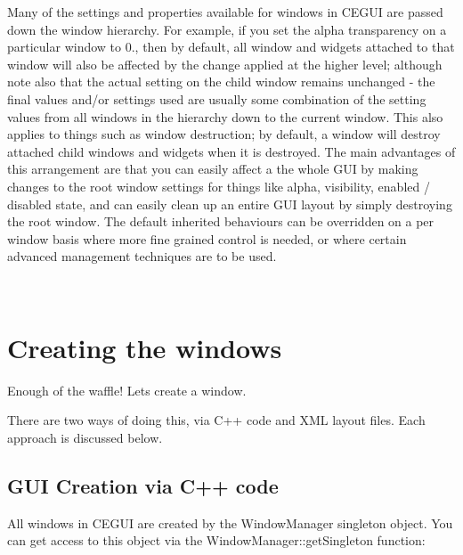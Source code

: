 Many of the settings and properties available for windows in C\+E\+G\+UI are passed down the window hierarchy. For example, if you set the alpha transparency on a particular window to 0., then by default, all window and widgets attached to that window will also be affected by the change applied at the higher level; although note also that the actual setting on the child window remains unchanged -\/ the final values and/or settings used are usually some combination of the setting values from all windows in the hierarchy down to the current window. This also applies to things such as window destruction; by default, a window will destroy attached child windows and widgets when it is destroyed. The main advantages of this arrangement are that you can easily affect a the whole G\+UI by making changes to the root window settings for things like alpha, visibility, enabled / disabled state, and can easily \textquotesingle{}clean up\textquotesingle{} an entire G\+UI layout by simply destroying the root window. The default \textquotesingle{}inherited\textquotesingle{} behaviours can be overridden on a per window basis where more fine grained control is needed, or where certain advanced management techniques are to be used.

~\newline
 \hypertarget{window_tutorial_window_tutorial_creating_intro}{}\section{Creating the windows}\label{window_tutorial_window_tutorial_creating_intro}
Enough of the waffle! Let\textquotesingle{}s create a window.

There are two ways of doing this, via C++ code and X\+ML layout files. Each approach is discussed below.\hypertarget{window_tutorial_window_tutorial_creating_cpp}{}\subsection{G\+U\+I Creation via C++ code}\label{window_tutorial_window_tutorial_creating_cpp}
All windows in C\+E\+G\+UI are created by the Window\+Manager singleton object. You can get access to this object via the Window\+Manager\+::get\+Singleton function\+: 
\begin{DoxyCode}{0}
\end{DoxyCode}


